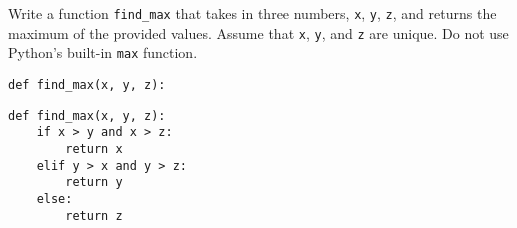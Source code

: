 \begin{blocksection}
\question Write a function \lstinline{find_max} that takes in three numbers, \lstinline{x}, \lstinline{y}, \lstinline{z}, and returns the maximum of the provided values. Assume that \lstinline{x}, \lstinline{y}, and \lstinline{z} are unique. Do not use Python's built-in \texttt{max} function.

\begin{lstlisting}
def find_max(x, y, z):
\end{lstlisting}
\begin{solution}[2in]
\begin{lstlisting}
def find_max(x, y, z):
    if x > y and x > z:
        return x
    elif y > x and y > z:
        return y
    else:
    	return z
\end{lstlisting}
\end{solution}
\end{blocksection}